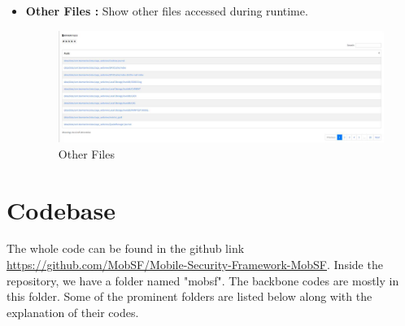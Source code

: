 \documentclass{report}
\begin{document}
\begin{itemize}
    \item \textbf{Other Files : } Show other files accessed during runtime. 
    \begin{figure}[hbt!]
    \centering
    \includegraphics[width=1\linewidth]{Dynamic Analyzer/others.jpg}
    \caption{Other Files}
    \label{fig:example}
    \end{figure}
    \FloatBarrier
\end{itemize}
\chapter{Codebase}
The whole code can be found in the github link \url{https://github.com/MobSF/Mobile-Security-Framework-MobSF}. Inside the repository, we have a folder named "mobsf". The backbone codes are mostly in this folder. Some of the prominent folders are listed below along with the explanation of their codes.
\end{document}
